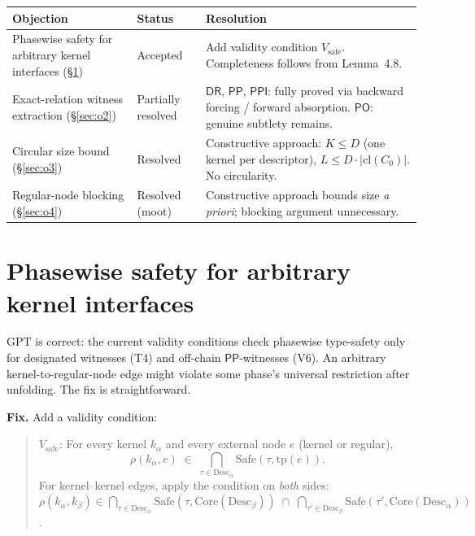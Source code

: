 \documentclass[11pt]{article}
\begin{document}
\begin{center}
\renewcommand{\arraystretch}{1.15}
\begin{tabularx}{\textwidth}{@{}p{}p{}Y@{}}
\toprule
\textbf{Objection} & \textbf{Status} & \textbf{Resolution} \\
\midrule
Phasewise safety for arbitrary kernel interfaces (\S\ref{sec:o1})
  & Accepted
  & Add validity condition $V_{\mathrm{safe}}$.  Completeness
    follows from Lemma~4.8. \\
Exact-relation witness extraction (\S\ref{sec:o2})
  & Partially resolved
  & $\mathsf{DR}$, $\mathsf{PP}$, $\mathsf{PPI}$: fully proved via
    backward forcing / forward absorption.  $\mathsf{PO}$:
    genuine subtlety remains. \\
Circular size bound (\S\ref{sec:o3})
  & Resolved
  & Constructive approach: $K \le D$ (one kernel per descriptor),
    $L \le D \cdot |\mathrm{cl}(C_0)|$.  No circularity. \\
Regular-node blocking (\S\ref{sec:o4})
  & Resolved (moot)
  & Constructive approach bounds size \emph{a priori};
    blocking argument unnecessary. \\
\bottomrule
\end{tabularx}
\end{center}


\section{Phasewise safety for arbitrary kernel interfaces}
\label{sec:o1}

GPT is correct: the current validity conditions check phasewise
type-safety only for designated witnesses (T4) and off-chain
$\mathsf{PP}$-witnesses (V6).  An arbitrary kernel-to-regular-node
edge might violate some phase's universal restriction after
unfolding.  The fix is straightforward.

\textbf{Fix.}\; Add a validity condition:
\begin{quote}
$V_{\mathrm{safe}}$:\; For every kernel $k_\alpha$ and every
external node $e$ (kernel or regular),
\[
\rho(k_\alpha, e) \;\in\;
  \bigcap_{\tau \in \mathrm{Desc}_\alpha}
  \mathrm{Safe}(\tau, \mathrm{tp}(e)).
\]
For kernel--kernel edges, apply the condition on \emph{both} sides:
$\rho(k_\alpha, k_\beta) \in
\bigcap_{\tau \in \mathrm{Desc}_\alpha}\mathrm{Safe}(\tau,\mathrm{Core}(\mathrm{Desc}_\beta))
\;\cap\;
\bigcap_{\tau' \in \mathrm{Desc}_\beta}\mathrm{Safe}(\tau',\mathrm{Core}(\mathrm{Desc}_\alpha))$.
\end{quote}
\end{document}
